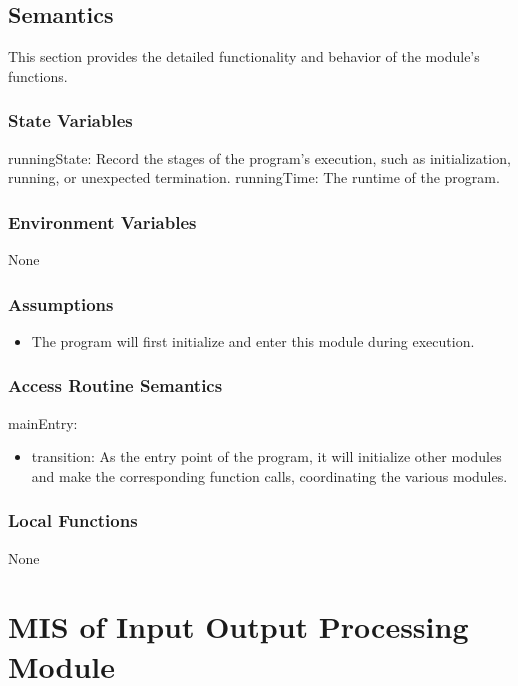 \documentclass[12pt, titlepage]{article}
\begin{document}
\subsection{Semantics}

This section provides the detailed functionality and behavior of the module’s
functions.

\subsubsection{State Variables}

runningState: Record the stages of the program's execution, such as
initialization, running, or unexpected termination.  runningTime: The runtime of
the program.

\subsubsection{Environment Variables}

None

\subsubsection{Assumptions}

\begin{itemize}
\item The program will first initialize and enter this module during execution.
\end{itemize}

\subsubsection{Access Routine Semantics}

\noindent mainEntry:
\begin{itemize}
\item transition: As the entry point of the program, it will initialize other
modules and make the corresponding function calls, coordinating the various
modules.
\end{itemize}

\subsubsection{Local Functions}

None

\newpage

\section{MIS of Input Output Processing Module} \label{MIS_IO}
\end{document}
